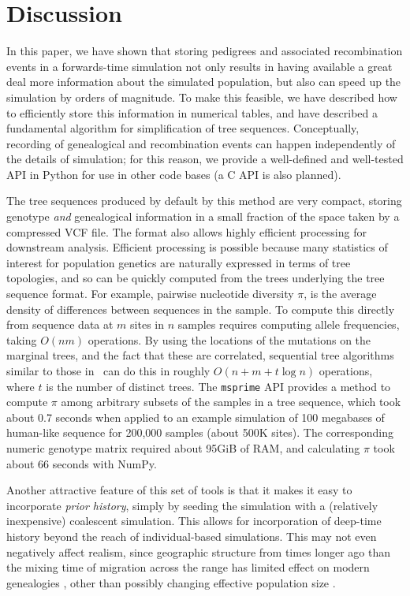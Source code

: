 \documentclass{article}
\newcommand{\msprime}{\texttt{msprime}}
\begin{document}
\section*{Discussion}

In this paper, we have shown that storing pedigrees
and associated recombination events
in a forwards-time simulation
not only results in having available a great deal more information about the simulated population,
but also can speed up the simulation by orders of magnitude.
To make this feasible,
we have described how to efficiently store this information in numerical tables,
and have described a fundamental algorithm for simplification of tree sequences.
Conceptually, recording of genealogical and recombination events
can happen independently of the details of simulation;
for this reason, we provide a well-defined and well-tested API in Python
for use in other code bases (a C API is also planned).

The tree sequences produced by default by this method
are very compact, storing genotype \emph{and} genealogical information
in a small fraction of the space taken by a compressed VCF file.
The format also allows highly efficient processing for downstream analysis.
Efficient processing is possible because many statistics of interest for population genetics
are naturally expressed in terms of tree topologies,
and so can be quickly computed from the trees underlying the tree sequence format.
For example, pairwise nucleotide diversity $\pi$, is the average density of
differences between sequences in the sample.
To compute this directly from sequence data at $m$ sites in $n$ samples
requires computing allele frequencies, taking $O(nm)$ operations.
By using the locations of the mutations on the marginal trees,
and the fact that these are correlated,
sequential tree algorithms similar to those in~\citep{kelleher2016efficient}
can do this in roughly $O(n + m + t \log n)$ operations, where
$t$ is the number of distinct trees.
The \msprime{} API provides a method to compute $\pi$ among arbitrary subsets of the
samples in a tree sequence, which took about 0.7 seconds when
applied to an example simulation of 100 megabases of human-like
sequence for 200,000 samples (about 500K sites). The corresponding
numeric genotype matrix required about 95GiB of RAM, and
calculating $\pi$ took about 66 seconds with NumPy.


Another attractive feature of this set of tools
is that it makes it easy to incorporate \emph{prior history},
simply by seeding the simulation with a (relatively inexpensive) coalescent simulation.
This allows for incorporation of deep-time history beyond the reach of individual-based simulations.
This may not even negatively affect realism,
since geographic structure from times longer ago than the mixing
time of migration across the range has limited effect on modern genealogies
\citep{wilkins2004separation},
other than possibly changing effective population size \citep{barton2002neutral,cox2002stepping}.
\end{document}
